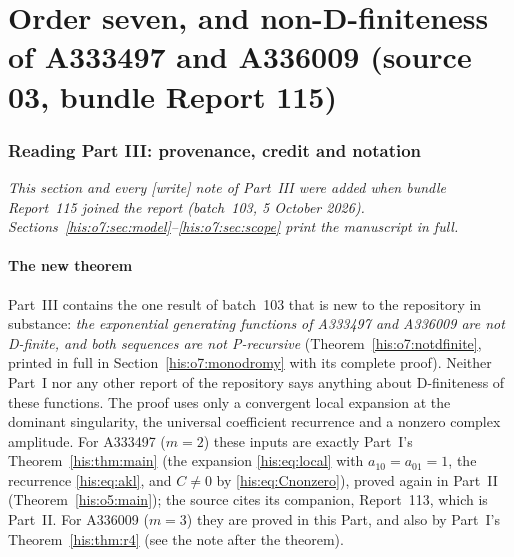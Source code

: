 \documentclass[11pt]{article}
\theoremstyle{remark}\newtheorem{remark}[theorem]{Remark}
\numberwithin{equation}{section}
\begin{document}
\clearpage
\part{Order seven, and non-D-finiteness of A333497 and A336009 (source 03, bundle Report 115)}\label{his:o7:part}

\section{Reading Part III: provenance, credit and notation}\label{his:o7:sec:reading}
\emph{This section and every \textsf{[write]} note of Part~III were added when bundle Report~115 joined the report (batch~103, 5 October 2026). Sections~\ref{his:o7:sec:model}--\ref{his:o7:sec:scope} print the manuscript in full.}

\subsection{The new theorem}\label{his:o7:sec:headline}
Part~III contains the one result of batch~103 that is new to the repository in substance: \emph{the exponential generating functions of A333497 and A336009 are not D-finite, and both sequences are not P-recursive} (Theorem~\ref{his:o7:notdfinite}, printed in full in Section~\ref{his:o7:monodromy} with its complete proof). Neither Part~I nor any other report of the repository says anything about D-finiteness of these functions. The proof uses only a convergent local expansion at the dominant singularity, the universal coefficient recurrence and a nonzero complex amplitude. For A333497 ($m=2$) these inputs are exactly Part~I's Theorem~\ref{his:thm:main} (the expansion \eqref{his:eq:local} with $a_{10}=a_{01}=1$, the recurrence \eqref{his:eq:akl}, and $C\ne0$ by \eqref{his:eq:Cnonzero}), proved again in Part~II (Theorem~\ref{his:o5:main}); the source cites its companion, Report~113, which is Part~II. For A336009 ($m=3$) they are proved in this Part, and also by Part~I's Theorem~\ref{his:thm:r4} (see the note after the theorem).
\end{document}
